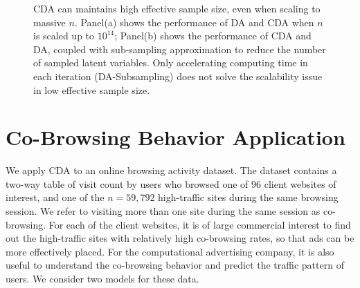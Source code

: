 \documentclass[11pt]{article}
\begin{document}
\begin{figure}[H]
  {\caption{CDA can maintains high effective sample size, even when scaling
 to massive $n$. Panel(a) shows the performance of DA and CDA when $n$ is scaled up to
 $10^{14}$; Panel(b) shows the performance of CDA and DA, coupled with sub-sampling
 approximation to reduce the number of sampled latent variables. Only accelerating computing time in each iteration (DA-Subsampling) does not solve the scalability issue in low
effective sample size.      \label{massive_n_sims}}}
  {%
    \qquad
  }
\end{figure}





 \section{Co-Browsing Behavior Application}

We apply CDA to an online browsing activity dataset. The dataset contains a two-way  table of visit count by users who browsed one of $96$ client websites of interest, and one of the  $n=59,792$ high-traffic sites during the same browsing session. We refer to visiting more than one site during the same session as co-browsing. For each of the client websites, it is of large commercial interest to find out the high-traffic sites with relatively high co-browsing rates, so that ads can be more effectively placed. For the computational advertising company, it is also useful to understand the co-browsing behavior and predict the traffic pattern of users. We consider two models for these data.
\end{document}

